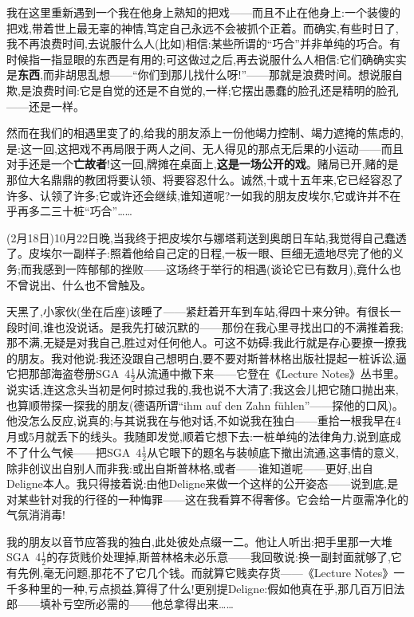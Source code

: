 \dmark{}我在这里重新遇到一个我在他身上熟知的把戏——而且不止在他身上:一个装傻的把戏,带着世上最无辜的神情,笃定自己永远不会被抓个正着。而确实,有些时日了,我不再浪费时间,去说服什么人(比如)相信:某些所谓的“巧合”并非单纯的巧合。有时候指一指显眼的东西是有用的;可这做过之后,再去说服什么人相信:它们确确实实是\textbf{东西},而非胡思乱想——“你们到那儿找什么呀!”——那就是浪费时间。想说服自欺,是浪费时间:它是自觉的还是不自觉的,一样;它摆出愚蠢的脸孔还是精明的脸孔——还是一样。

然而在我们的相遇里变了的,给我的朋友添上一份他竭力控制、竭力遮掩的焦虑的,是:这一回,这把戏不再局限于两人之间、无人得见的那点无后果的小运动——而且对手还是一个\textbf{亡故者}!这一回,牌摊在桌面上,\textbf{这是一场公开的戏}。赌局已开,赌的是那位大名鼎鼎的教团将要认领、将要容忍什么。诚然,十或十五年来,它已经容忍了许多、认领了许多;它或许还会继续,谁知道呢?一如我的朋友皮埃尔,它或许并不在乎再多二三十桩“巧合”……

(2月18日)10月22日晚,当我终于把皮埃尔与娜塔莉送到奥朗日车站,我觉得自己蠢透了。皮埃尔一副样子:照着他给自己定的日程,一板一眼、巨细无遗地尽完了他的义务;而我感到一阵郁郁的挫败——这场终于举行的相遇(谈论它已有数月),竟什么也不曾说出、什么也不曾触及。

天黑了,小家伙(坐在后座)该睡了——紧赶着开车到车站,得四十来分钟。有很长一段时间,谁也没说话。是我先打破沉默的——那份在我心里寻找出口的不满推着我;那不满,无疑是对我自己,胜过对任何他人。可这不妨碍:我此行就是存心要撩一撩我的朋友。我对他说:我还没跟自己想明白,要不要对斯普林格出版社提起一桩诉讼,逼它把那部海盗卷册SGA~4$\frac{1}{2}$\dmark{}从流通中撤下来——它登在《Lecture Notes》丛书里。说实话,连这念头当初是何时掠过我的,我也说不大清了;我这会儿把它随口抛出来,也算顺带探一探我的朋友(德语所谓“ihm auf den Zahn fühlen”——探他的口风)。他没怎么反应,说真的;与其说我在与他对话,不如说我在独白——重拾一根我早在4月或5月就丢下的线头。我随即发觉,顺着它想下去:一桩单纯的法律角力,说到底成不了什么气候——把SGA~4$\frac{1}{2}$从它眼下的题名与装帧底下撤出流通,这事情的意义,除非创议出自别人而非我:或出自斯普林格,或者——谁知道呢——更好,出自Deligne本人。我只得接着说:由他Deligne来做一个这样的公开姿态——说到底,是对某些针对我的行径的一种悔罪——这在我看算不得奢侈。它会给一片亟需净化的气氛消消毒!

我的朋友以音节应答我的独白,此处彼处点缀一二。他让人听出:把手里那一大堆SGA~4$\frac{1}{2}$的存货贱价处理掉,斯普林格未必乐意——我回敬说:换一副封面就够了,它有先例,毫无问题,那花不了它几个钱。而就算它贱卖存货——《Lecture Notes》一千多种里的一种,亏点损益,算得了什么!更别提Deligne:假如他真在乎,那几百万旧法郎——填补亏空所必需的——他总拿得出来……

